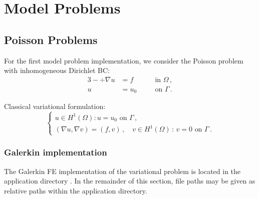 %
%

\chapter{Model Problems}
\label{chap:examples}


\section{Poisson Problems}
\label{sec:poisson}

For the first model problem implementation, we consider the Poisson problem with inhomogeneous Dirichlet BC:
\begin{alignat*}{3}
	- \div \nabla u &= f && \quad \text{in } \Omega \, , \\
	u &= u_0 && \quad \text{on } \Gamma \, .
\end{alignat*}

Classical variational formulation:
\[
\left\{
\begin{array}{llll}
	u \in H^1(\Omega):  u = u_0 \text{ on } \Gamma \, , \\[5pt]
	(\nabla u, \nabla v) = (f,v) \, ,
	\quad v \in H^1(\Omega) \, : \, v = 0 \text{ on } \Gamma \, .
\end{array}
\right.
\]

\subsection{Galerkin implementation}
\label{subsec:poisson-galerkin}

The Galerkin FE implementation of the variational problem is located in the application directory . In the remainder of this section, file paths may be given as relative paths within the application directory.


